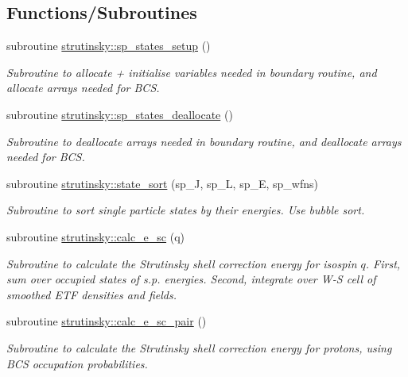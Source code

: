 \subsection*{Functions/\+Subroutines}
\begin{DoxyCompactItemize}
\item 
subroutine \mbox{\hyperlink{namespacestrutinsky_a6eeba7570095328226f37df3e89b7a18}{strutinsky\+::sp\+\_\+states\+\_\+setup}} ()
\begin{DoxyCompactList}\small\item\em Subroutine to allocate + initialise variables needed in \textquotesingle{}boundary\textquotesingle{} routine, and allocate arrays needed for B\+CS. \end{DoxyCompactList}\item 
subroutine \mbox{\hyperlink{namespacestrutinsky_a0a07c6adfd14cbf345bf96b70d3f5d82}{strutinsky\+::sp\+\_\+states\+\_\+deallocate}} ()
\begin{DoxyCompactList}\small\item\em Subroutine to deallocate arrays needed in \textquotesingle{}boundary\textquotesingle{} routine, and deallocate arrays needed for B\+CS. \end{DoxyCompactList}\item 
subroutine \mbox{\hyperlink{namespacestrutinsky_a106e8ec285383b5042e8436a2376147a}{strutinsky\+::state\+\_\+sort}} (sp\+\_\+J, sp\+\_\+L, sp\+\_\+E, sp\+\_\+wfns)
\begin{DoxyCompactList}\small\item\em Subroutine to sort single particle states by their energies. Use bubble sort. \end{DoxyCompactList}\item 
subroutine \mbox{\hyperlink{namespacestrutinsky_a7a348b225e6556c53687ee28ee31b316}{strutinsky\+::calc\+\_\+e\+\_\+sc}} (q)
\begin{DoxyCompactList}\small\item\em Subroutine to calculate the Strutinsky shell correction energy for isospin $q$. First, sum over occupied states of s.\+p. energies. Second, integrate over W-\/S cell of smoothed E\+TF densities and fields. \end{DoxyCompactList}\item 
subroutine \mbox{\hyperlink{namespacestrutinsky_a2cc0d4130d68c345ffe3ffa73706e796}{strutinsky\+::calc\+\_\+e\+\_\+sc\+\_\+pair}} ()
\begin{DoxyCompactList}\small\item\em Subroutine to calculate the Strutinsky shell correction energy for protons, using B\+CS occupation probabilities. \end{DoxyCompactList}\end{DoxyCompactItemize}
